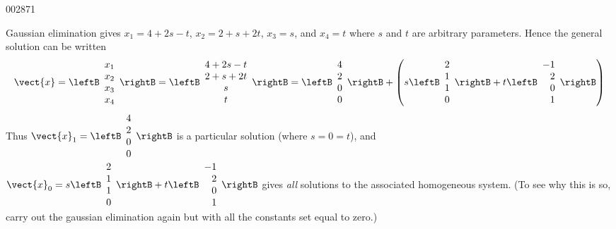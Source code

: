 \begin{example}{}{002871}
\begin{solution}
  Gaussian elimination gives $x_{1} = 4 + 2s - t$, $x_{2} = 2 + s + 2t$, $x_{3} = s$, and $x_{4} = t$ where $s$ and $t$ are arbitrary parameters. Hence the general solution can be written
\begin{equation*}
\vect{x} = \leftB \begin{array}{c}
x_{1} \\
x_{2} \\
x_{3} \\
x_{4}
\end{array} \rightB = 
\leftB \begin{array}{c}
4 + 2s - t \\
2 + s + 2t \\
s \\
t
\end{array} \rightB = 
\leftB \begin{array}{r}
4 \\
2 \\
0 \\
0
\end{array} \rightB +
\left( s \leftB \begin{array}{r}
2 \\
1 \\
1 \\
0
\end{array} \rightB + t \leftB \begin{array}{r}
-1 \\
2 \\
0 \\
1
\end{array} \rightB \right)
\end{equation*}
Thus 
$\vect{x}_1 = \leftB \begin{array}{r}
4 \\
2 \\
0 \\
0
\end{array} \rightB$
 is a particular solution (where $s = 0 = t$), and 
$
\vect{x}_{0} = s \leftB \begin{array}{r}
2 \\
1 \\
1 \\
0
\end{array} \rightB + t \leftB \begin{array}{r}
-1 \\
2 \\
0 \\
1
\end{array} \rightB$ gives \textit{all} solutions to the associated homogeneous system. (To see why this is so, carry out the gaussian elimination again but with all the constants set equal to zero.)
\end{solution}
\end{example}

